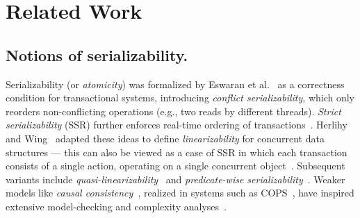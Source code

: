 
\section{Related Work}
\label{sec:related-work}

%
%
%

\subsection{Notions of serializability.}
\label{subsec:related:notions-of-serializability}

Serializability (or \emph{atomicity}) was formalized by Eswaran et al.~\cite{EsGrKoTr76} as a correctness condition for transactional systems, introducing \emph{conflict serializability}, which only reorders non-conflicting operations (e.g., two reads by 
different threads). \emph{Strict serializability} (SSR) further enforces real-time ordering of transactions~\cite{Pa79}. Herlihy and Wing~\cite{HeWe87,HeWi90} adapted these ideas to define \emph{linearizability} for concurrent data structures --- this can also be viewed as a case of SSR in 
which each transaction consists of a single action, operating on a single 
concurrent object~\cite{WaSt06a}.
Subsequent variants include \emph{quasi-linearizability}~\cite{ZhChWa13} and \emph{predicate-wise serializability}~\cite{RaMeBrKoSi93}. Weaker models like \emph{causal consistency}~\cite{La78,AhNeBuKoHu95}, realized in systems such as COPS~\cite{LlFrKaAn11}, have inspired extensive model-checking and complexity analyses~\cite{BoEnGuHa17,ZeBiBoEnEr19,LaBo20}.

